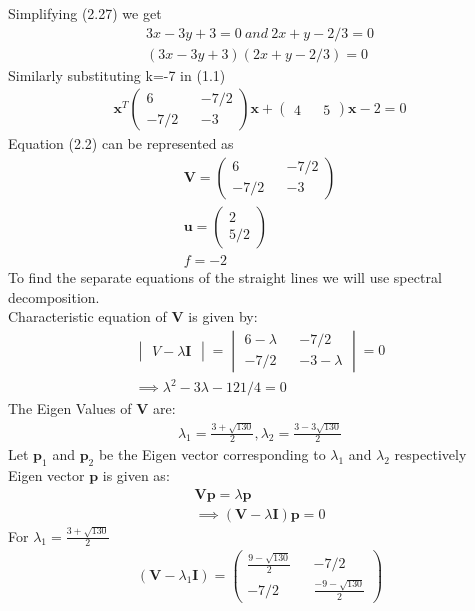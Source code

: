 \documentclass[journal,13pt,twocolumn]{IEEEtran}
\newcommand{\myvec}[1]{\ensuremath{\begin{pmatrix}#1\end{pmatrix}}}
\newcommand{\mydet}[1]{\ensuremath{\begin{vmatrix}#1\end{vmatrix}}}
\renewcommand{\vec}[1]{\mathbf{#1}}
\begin{document}
Simplifying (2.27) we get 
\begin{equation}
\begin{split}
3x - 3y + 3 = 0 ~and~ 2x + y - 2/3 = 0\\
\boxed{(3x - 3y + 3)(2x + y - 2/3) = 0}
\end{split}
\end{equation}
Similarly substituting k=-7 in (1.1)
\begin{align}
\vec{x}^T \myvec{6 && -7/2 \\ -7/2 && -3} \vec{x} + \myvec{4 && 5}\vec{x} -2 = 0
\end{align}
Equation (2.2) can be represented as 
\begin{equation}
\begin{split}
\vec{V}=\myvec{6 && -7/2\\ -7/2 && -3}\\
\vec{u}=\myvec{2\\5/2}\\
f= -2
\end{split}
\end{equation}
To find the separate equations of the straight lines we will use spectral decomposition.\\
Characteristic equation of $\vec{V}$ is given by:
\begin{equation}
\begin{split}
\mydet{V-\lambda \vec{I}}=\mydet{6-\lambda && -7/2\\ -7/2 && -3-\lambda} = 0\\
\implies \lambda^2 - 3\lambda - 121/4 = 0
\end{split}
\end{equation}
The Eigen Values of $\vec{V}$ are:
\begin{align}
\lambda_1 = \frac{3+\sqrt{130}}{2}, \lambda_2 = \frac{3-3\sqrt{130}}{2}
\end{align}
Let $\vec{p}_1$ and $\vec{p}_2$ be the Eigen vector corresponding to $\lambda_1$ and $\lambda_2$ respectively\\
Eigen vector $\vec{p}$ is given as:
\begin{equation} 
\begin{split}
\vec{V}\vec{p} = \lambda\vec{p}\\
\implies (\vec{V} - \lambda \vec{I})\vec{p} = 0
\end{split}
\end{equation}
For $\lambda_1 = \frac{3+\sqrt{130}}{2}$
\begin{align}
(\vec{V} - \lambda_1 \vec{I}) = \myvec{\frac{9-\sqrt{130}}{2} && -7/2\\ -7/2 && \frac{-9-\sqrt{130}}{2}}
\end{align}
\end{document}
